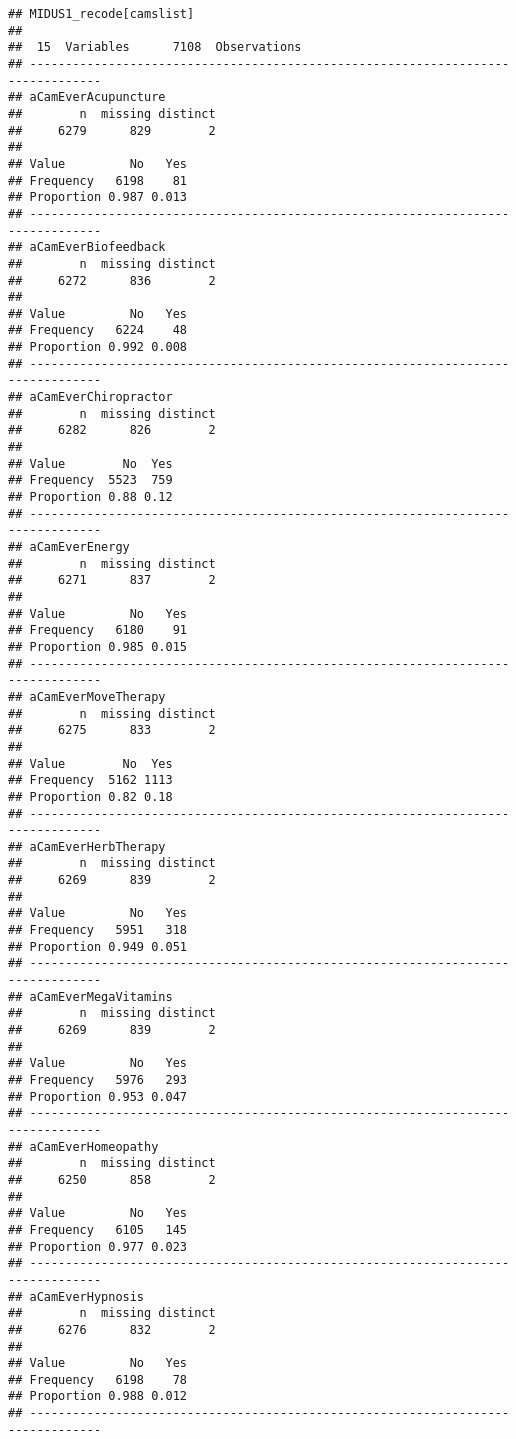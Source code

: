 \documentclass[
]{article}
\begin{document}
\begin{verbatim}
## MIDUS1_recode[camslist] 
## 
##  15  Variables      7108  Observations
## --------------------------------------------------------------------------------
## aCamEverAcupuncture 
##        n  missing distinct 
##     6279      829        2 
##                       
## Value         No   Yes
## Frequency   6198    81
## Proportion 0.987 0.013
## --------------------------------------------------------------------------------
## aCamEverBiofeedback 
##        n  missing distinct 
##     6272      836        2 
##                       
## Value         No   Yes
## Frequency   6224    48
## Proportion 0.992 0.008
## --------------------------------------------------------------------------------
## aCamEverChiropractor 
##        n  missing distinct 
##     6282      826        2 
##                     
## Value        No  Yes
## Frequency  5523  759
## Proportion 0.88 0.12
## --------------------------------------------------------------------------------
## aCamEverEnergy 
##        n  missing distinct 
##     6271      837        2 
##                       
## Value         No   Yes
## Frequency   6180    91
## Proportion 0.985 0.015
## --------------------------------------------------------------------------------
## aCamEverMoveTherapy 
##        n  missing distinct 
##     6275      833        2 
##                     
## Value        No  Yes
## Frequency  5162 1113
## Proportion 0.82 0.18
## --------------------------------------------------------------------------------
## aCamEverHerbTherapy 
##        n  missing distinct 
##     6269      839        2 
##                       
## Value         No   Yes
## Frequency   5951   318
## Proportion 0.949 0.051
## --------------------------------------------------------------------------------
## aCamEverMegaVitamins 
##        n  missing distinct 
##     6269      839        2 
##                       
## Value         No   Yes
## Frequency   5976   293
## Proportion 0.953 0.047
## --------------------------------------------------------------------------------
## aCamEverHomeopathy 
##        n  missing distinct 
##     6250      858        2 
##                       
## Value         No   Yes
## Frequency   6105   145
## Proportion 0.977 0.023
## --------------------------------------------------------------------------------
## aCamEverHypnosis 
##        n  missing distinct 
##     6276      832        2 
##                       
## Value         No   Yes
## Frequency   6198    78
## Proportion 0.988 0.012
## --------------------------------------------------------------------------------

\end{verbatim}
\end{document}

